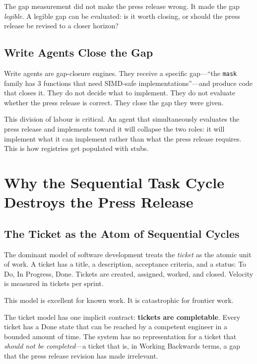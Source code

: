 \documentclass[11pt,a4paper]{article}
\newcommand{\code}[1]{\texttt{#1}}
\begin{document}
The gap measurement did not make the press release wrong.  It made the gap
\emph{legible}.  A legible gap can be evaluated: is it worth closing, or should
the press release be revised to a closer horizon?

\subsection{Write Agents Close the Gap}

Write agents are gap-closure engines.  They receive a specific gap---``the
\code{mask} family has 3 functions that need SIMD-safe implementations''---and
produce code that closes it.  They do not decide what to implement.  They do
not evaluate whether the press release is correct.  They close the gap they
were given.

This division of labour is critical.  An agent that simultaneously evaluates
the press release and implements toward it will collapse the two roles: it will
implement what it can implement rather than what the press release requires.
This is how registries get populated with stubs.

\section{Why the Sequential Task Cycle Destroys the Press Release}

\subsection{The Ticket as the Atom of Sequential Cycles}

The dominant model of software development treats the \emph{ticket} as the
atomic unit of work.  A ticket has a title, a description, acceptance criteria,
and a status: To Do, In Progress, Done.  Tickets are created, assigned, worked,
and closed.  Velocity is measured in tickets per sprint.

This model is excellent for known work.  It is catastrophic for frontier work.

The ticket model has one implicit contract: \textbf{tickets are completable}.
Every ticket has a Done state that can be reached by a competent engineer in a
bounded amount of time.  The system has no representation for a ticket that
\emph{should not be completed}---a ticket that is, in Working Backwards terms,
a gap that the press release revision has made irrelevant.
\end{document}
